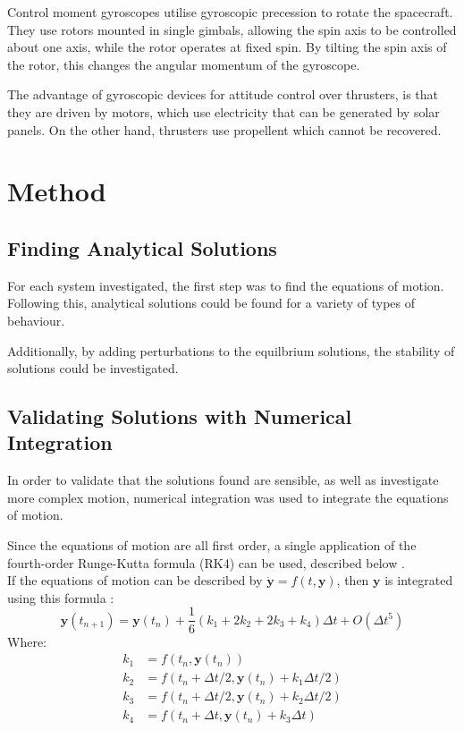 \documentclass[12]{article}
\begin{document}
\begin{multicols*}{2}
Control moment gyroscopes utilise gyroscopic precession to rotate the spacecraft. They use rotors mounted in single gimbals, allowing the spin axis to be controlled about one axis, while the rotor operates at fixed spin. By tilting the spin axis of the rotor, this changes the angular momentum of the gyroscope.

The advantage of gyroscopic devices for attitude control over thrusters, is that they are driven by motors, which use electricity that can be generated by solar panels. On the other hand, thrusters use propellent which cannot be recovered.

\section{Method}

\subsection{Finding Analytical Solutions}

For each system investigated, the first step was to find the equations of motion. Following this, analytical solutions could be found for a variety of types of behaviour.

Additionally, by adding perturbations to the equilbrium solutions, the stability of solutions could be investigated.

\subsection{Validating Solutions with Numerical Integration}

In order to validate that the solutions found are sensible, as well as investigate more complex motion, numerical integration was used to integrate the equations of motion.

Since the equations of motion are all first order, a single application of the fourth-order Runge-Kutta formula (RK4) can be used, described below \cite{RK4}. \\
If the equations of motion can be described by $\dot{\bm{y}} = f(t, \bm{y})$, then $\bm{y}$ is integrated using this formula :
$$ \bm{y}(t_{n+1}) = \bm{y}(t_n) +
\frac{1}{6}(k_1 + 2k_2 + 2k_3 + k_4)\Delta t + O(\Delta t^5)$$
Where:
\begin{align*}
k_1 &= f(t_n, \bm{y}(t_n)) \\
k_2 &= f(t_n + \Delta t/2, \bm{y}(t_n) + k_1\Delta t/2) \\
k_3 &= f(t_n + \Delta t/2, \bm{y}(t_n) + k_2\Delta t/2) \\
k_4 &= f(t_n + \Delta t, \bm{y}(t_n) + k_3\Delta t)
\end{align*}


\end{multicols*}
\end{document}

